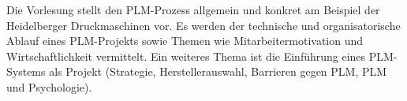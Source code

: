 \begin{module}
\begin{content}
Die Vorlesung stellt den PLM-Prozess allgemein und konkret am Beispiel der Heidelberger Druckmaschinen vor. Es werden der technische und organisatorische Ablauf eines PLM-Projekts sowie Themen wie Mitarbeitermotivation und Wirtschaftlichkeit vermittelt. Ein weiteres Thema ist die Einführung eines PLM-Systems als Projekt (Strategie, Herstellerauswahl, Barrieren gegen PLM, PLM und Psychologie).


\end{content}



\end{module}

